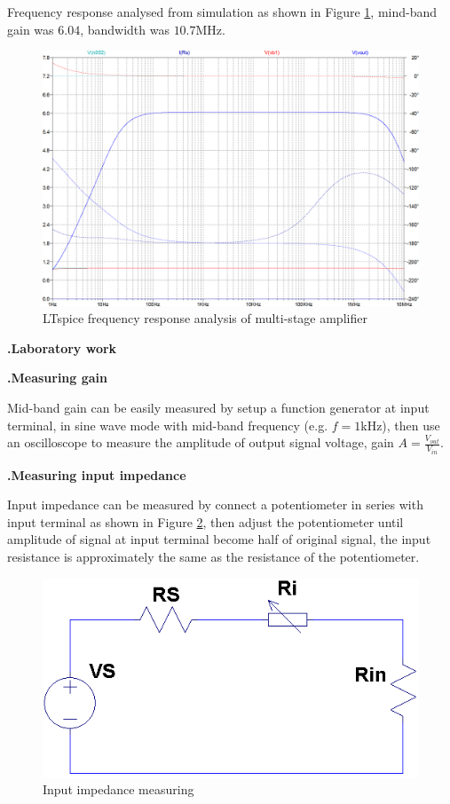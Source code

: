 \documentclass[a4paper,notitlepage,10pt]{report}
\newcommand{\tab}{\hspace{0.75cm}}
\newcommand{\fontHeading}{\fontsize{12pt}{13.2pt}\selectfont}
\newcommand{\fontSubHeading}{\fontsize{10pt}{11pt}\selectfont}
\newcounter{sections}
\newcounter{subsections}[sections]
\begin{document}
\begin{multicols}{2}
Frequency response analysed from simulation as shown in Figure \ref{fig:freq}, mind-band gain was $6.04$, bandwidth was $10.7$MHz.
\parskip=0pt

\begin{figure}[H]
	\centering
	\includegraphics[width=0.8\columnwidth]{freq}
	\caption{LTspice frequency response analysis of multi-stage amplifier}
	\label{fig:freq}
\end{figure}
\parskip=10pt


\fontHeading
{}
\textbf{.\tab Laboratory work}

\parskip=6pt
\fontSubHeading
{}
\textbf{.\tab Measuring gain}

Mid-band gain can be easily measured by setup a function generator at input terminal, in sine wave mode with mid-band frequency (e.g. $f = 1$kHz), then use an oscilloscope to measure the amplitude of output signal voltage, gain $A = \frac{V_{out}}{V_{in}}$.

\fontSubHeading
{}
\textbf{.\tab Measuring input impedance}

Input impedance can be measured by connect a potentiometer in series with input terminal as shown in Figure \ref{fig:inputimp}, then adjust the potentiometer until amplitude of signal at input terminal become half of original signal, the input resistance is approximately the same as the resistance of the potentiometer.
\parskip=0pt

\begin{figure}[H]
	\centering
	\includegraphics[width=\columnwidth]{inputimp}
	\caption{Input impedance measuring}
	\label{fig:inputimp}
\end{figure}
\parskip=6pt


\end{multicols}
\end{document}
